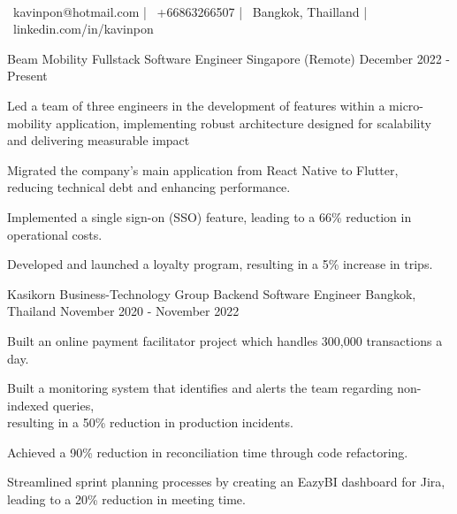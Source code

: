 \documentclass[]{awesome-cv}
\begin{document}
\begin{center}
	  \\
	\vspace{2mm}
	{\faEnvelope\ kavinpon@hotmail.com} | {\faMobile\ +66863266507} | {\faMapMarker\ Bangkok, Thailland} | {\faLinkedin\ linkedin.com/in/kavinpon}
\end{center}
\begin{cventries}
	\cventry
	{Beam Mobility}
	{Fullstack Software Engineer}
	{Singapore (Remote)}
	{December 2022 - Present}
	{\begin{cvitems}
			\item {Led a team of three engineers in the development of features within a micro-mobility application, implementing robust architecture designed for scalability and delivering measurable impact}
			\item {Migrated the company's main application from React Native to Flutter,\\ reducing technical debt and enhancing performance.}
			\item {Implemented a single sign-on (SSO) feature, leading to a 66\% reduction in operational costs.}
			\item {Developed and launched a loyalty program, resulting in a 5\% increase in trips.}
		\end{cvitems}}
	\cventry
	{Kasikorn Business-Technology Group}
	{Backend Software Engineer}
	{Bangkok, Thailand}
	{November 2020 - November 2022}
	{\begin{cvitems}
			\item {Built an online payment facilitator project which handles 300,000 transactions a day.}
			\item {Built a monitoring system that identifies and alerts the team regarding non-indexed queries,\\ resulting in a 50\% reduction in production incidents.}
			\item {Achieved a 90\% reduction in reconciliation time through code refactoring.}
			\item {Streamlined sprint planning processes by creating an EazyBI dashboard for Jira,\\ leading to a 20\% reduction in meeting time.}
		\end{cvitems}}

\end{cventries}
\end{document}
